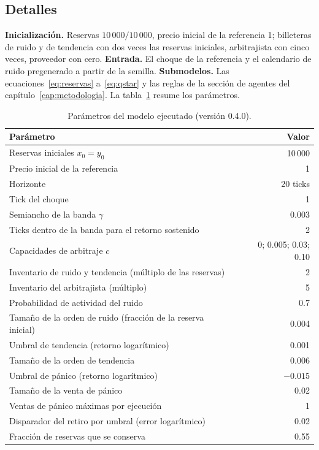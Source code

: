 \subsection*{Detalles}

\textbf{Inicialización.} Reservas $10\,000/10\,000$, precio inicial de la referencia 1; billeteras de ruido y de tendencia con dos veces las reservas iniciales, arbitrajista con cinco veces, proveedor con cero. \textbf{Entrada.} El choque de la referencia y el calendario de ruido pregenerado a partir de la semilla. \textbf{Submodelos.} Las ecuaciones~\eqref{eq:reservas} a~\eqref{eq:qstar} y las reglas de la sección de agentes del capítulo~\ref{cap:metodologia}. La tabla~\ref{tab:parametros} resume los parámetros.

\begin{table}[htbp]
\centering
\caption{Parámetros del modelo ejecutado (versión 0.4.0).}
\label{tab:parametros}
\small
\begin{tabular}{@{}lr@{}}
\toprule
Parámetro & Valor \\
\midrule
Reservas iniciales $x_0=y_0$ & 10\,000 \\
Precio inicial de la referencia & 1 \\
Horizonte & 20 ticks \\
Tick del choque & 1 \\
Semiancho de la banda $\gamma$ & 0.003 \\
Ticks dentro de la banda para el retorno sostenido & 2 \\
Capacidades de arbitraje $c$ & 0; 0.005; 0.03; 0.10 \\
Inventario de ruido y tendencia (múltiplo de las reservas) & 2 \\
Inventario del arbitrajista (múltiplo) & 5 \\
Probabilidad de actividad del ruido & 0.7 \\
Tamaño de la orden de ruido (fracción de la reserva inicial) & 0.004 \\
Umbral de tendencia (retorno logarítmico) & 0.001 \\
Tamaño de la orden de tendencia & 0.006 \\
Umbral de pánico (retorno logarítmico) & $-0.015$ \\
Tamaño de la venta de pánico & 0.02 \\
Ventas de pánico máximas por ejecución & 1 \\
Disparador del retiro por umbral (error logarítmico) & 0.02 \\
Fracción de reservas que se conserva & 0.55 \\
\bottomrule
\end{tabular}
\end{table}

